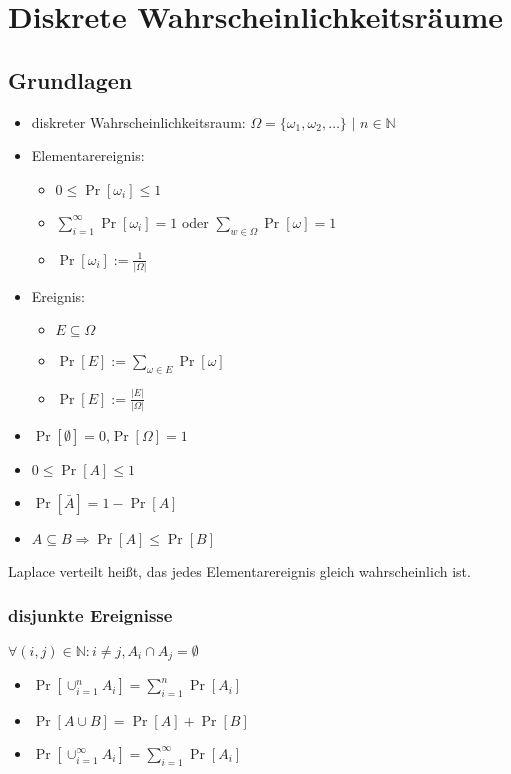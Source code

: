 
\section{Diskrete Wahrscheinlichkeitsräume}

\subsection{Grundlagen}

\begin{itemize}
\item diskreter Wahrscheinlichkeitsraum: $\Omega = \{\omega_1,\omega_2,\ldots\}$ $|$ $n\in \mathbb{N}$
\item Elementarereignis:\\
	\begin{itemize}
	\item $0 \leq \Pr[\omega_i]\leq 1$
	\item $\sum_{i=1}^\infty\Pr[\omega_i]=1$ oder $\sum_{w\in\Omega}\Pr[\omega]=1$
	\item $\Pr[\omega_i]:=\frac{1}{|\Omega|}$
	\end{itemize}
\item Ereignis:\\
	\begin{itemize}
	\item $E\subseteq\Omega$
	\item $\Pr[E]:=\sum_{\omega\in E}\Pr[\omega]$
	\item $\Pr[E]:=\frac{|E|}{|\Omega|}$
	\end{itemize}
\item $\Pr[\emptyset]=0$,$\Pr[\Omega]=1$ 
\item $0\leq \Pr[A] \leq 1$
\item $\Pr[\bar A]=1-\Pr[A]$
\item $A\subseteq B \Rightarrow \Pr[A]\leq \Pr[B]$
\end{itemize}

Laplace verteilt heißt, das jedes Elementarereignis gleich wahrscheinlich ist.

\subsubsection{disjunkte Ereignisse}
$\forall(i,j)\in\mathbb{N}: i\neq j, A_i\cap  A_j=\emptyset$
\begin{itemize}
\item $\Pr[\cup^n_{i=1}A_i]=\sum^n_{i=1}\Pr[A_i]$
\item $\Pr[A\cup B]=\Pr[A]+\Pr[B]$
\item $\Pr[\cup^\infty_{i=1}A_i]=\sum^\infty_{i=1}\Pr[A_i]$
\end{itemize}


